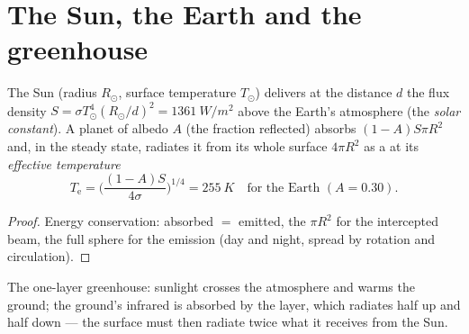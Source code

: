 \section{The Sun, the Earth and the greenhouse}

\begin{proposition}\label{prop:b2:thermal-radiation:earth}
The Sun (radius $R_\odot$, surface temperature $T_\odot$) delivers at the
distance $d$ the flux density $S = \sigma T_\odot^4 (R_\odot/d)^2 =
\qty{1361}{W/m^2}$ above the Earth's atmosphere (the \emph{solar
constant}). A planet of albedo $A$ (the fraction
reflected) absorbs $(1 - A)S\pi R^2$ and, in the steady state, radiates it
from its whole surface $4\pi R^2$ as a  at its \emph{effective
temperature}
\[
T_{\text{e}} = \Big(\frac{(1 - A)S}{4\sigma}\Big)^{1/4} = \qty{255}{K}
\quad\text{for the Earth } (A = 0.30) .
\]
\end{proposition}

\begin{proof}
Energy conservation: absorbed $= $ emitted, the  $\pi R^2$
for the intercepted beam, the full sphere for the emission (day and
night, spread by rotation and circulation).
\end{proof}

\begin{omfigure}

{\small The one-layer greenhouse: sunlight crosses the atmosphere and
warms the ground; the ground's infrared is absorbed by the layer, which
radiates half up and half down --- the surface must then radiate twice
what it receives from the Sun.}
\end{omfigure}

